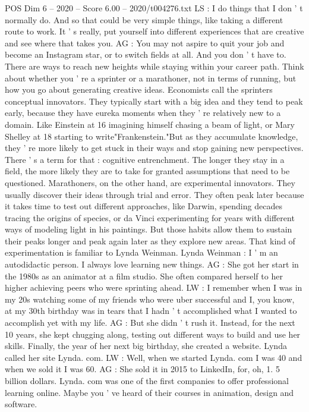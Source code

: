 \begin{textsample}{POS Dim 6 – 2020 – Score 6.00 – 2020/t004276.txt}
LS : I do things that I don ' t normally do.
And so that could be very simple things, like taking a different route to work.
It ' s really, put yourself into different experiences that are creative and see where that takes you.
AG : You may not aspire to quit your job and become an Instagram star, or to switch fields at all.
And you don ' t have to.
There are ways to reach new heights while staying within your career path.
Think about whether you ' re a sprinter or a marathoner, not in terms of running, but how you go about generating creative ideas.
Economists call the sprinters conceptual innovators.
They typically start with a big idea and they tend to peak early, because they have eureka moments when they ' re relatively new to a domain.
Like Einstein at 16 imagining himself chasing a beam of light, or Mary Shelley at 18 starting to write"Frankenstein."But as they accumulate knowledge, they ' re more likely to get stuck in their ways and stop gaining new perspectives.
There ' s a term for that : cognitive entrenchment.
The longer they stay in a field, the more likely they are to take for granted assumptions that need to be questioned.
Marathoners, on the other hand, are experimental innovators.
They usually discover their ideas through trial and error.
They often peak later because it takes time to test out different approaches, like Darwin, spending decades tracing the origins of species, or da Vinci experimenting for years with different ways of modeling light in his paintings.
But those habits allow them to sustain their peaks longer and peak again later as they explore new areas.
That kind of experimentation is familiar to Lynda Weinman.
Lynda Weinman : I ' m an autodidactic person.
I always love learning new things.
AG : She got her start in the 1980s as an animator at a film studio.
She often compared herself to her higher achieving peers who were sprinting ahead.
LW : I remember when I was in my 20s watching some of my friends who were uber successful and I, you know, at my 30th birthday was in tears that I hadn ' t accomplished what I wanted to accomplish yet with my life.
AG : But she didn ' t rush it.
Instead, for the next 10 years, she kept chugging along, testing out different ways to build and use her skills.
Finally, the year of her next big birthday, she created a website.
Lynda called her site Lynda. com.
LW : Well, when we started Lynda. com I was 40 and when we sold it I was 60.
AG : She sold it in 2015 to LinkedIn, for, oh, 1. 5 billion dollars.
Lynda. com was one of the first companies to offer professional learning online.
Maybe you ' ve heard of their courses in animation, design and software.

\end{textsample}
